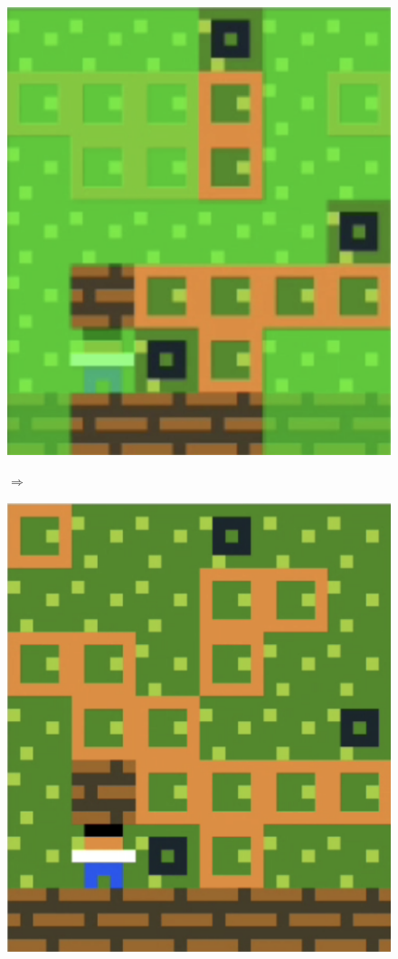 \begin{figure}[!htbp]
\begin{minipage}[t]{0.2\textwidth}
\includegraphics[width=\textwidth]{figures/p8greenb.png} \hfill \\
\end{minipage}
$\Longrightarrow$
\begin{minipage}[t]{0.2\textwidth}
\includegraphics[width=\textwidth]{figures/p8greenc.png} \hfill \\
\end{minipage}


\end{figure}
